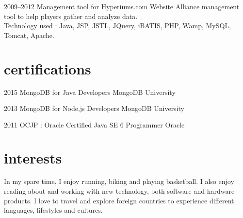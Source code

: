 \documentclass[]{friggeri-cv} %
\begin{document}
\begin{entrylist}

\entry
{2009--2012}
{Management tool for Hyperiums.com}
{Website}
{}
{Alliance management tool to help players gather and analyze data.\\
Technology used : Java, JSP, JSTL, JQuery, iBATIS, PHP, Wamp, MySQL, Tomcat, Apache.}

\end{entrylist}


\section{certifications}

\begin{entrylist}


\entry
{2015}
{MongoDB for Java Developers}
{MongoDB University}
{}
{}

\entry
{2013}
{MongoDB for Node.js Developers}
{MongoDB University}
{}
{}

\entry
{2011}
{OCJP : Oracle Certified Java SE 6 Programmer}
{Oracle}
{}
{}


\end{entrylist}


\section{interests}

In my spare time, I enjoy running, biking and playing basketball. I also enjoy reading about and working with new technology, both software and hardware products. I love to travel and explore foreign countries to experience different languages, lifestyles and cultures.
\end{document}

